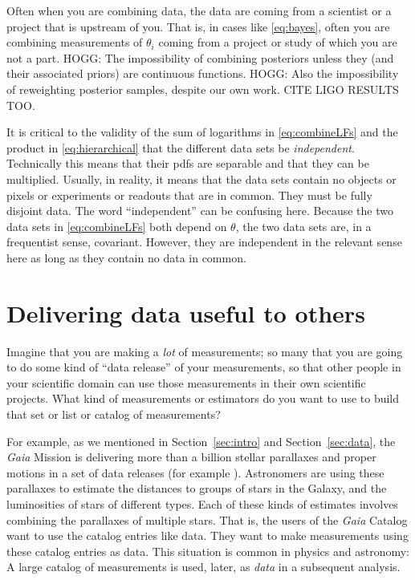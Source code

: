 \documentclass{article}
\newcommand{\sectionname}{Section}
\newcommand{\secref}[1]{\sectionname~\ref{#1}}
\begin{document}
Often when you are combining data, the data are coming from a scientist or a project that is upstream of you.
That is, in cases like \eqref{eq:bayes}, often you are combining measurements of $\theta_i$ coming from a project or study of which you are not a part.
HOGG: The impossibility of combining posteriors unless they (and their associated priors) are continuous functions.
HOGG: Also the impossibility of reweighting posterior samples, despite our own work. CITE LIGO RESULTS TOO.

It is critical to the validity of the sum of logarithms in \eqref{eq:combineLFs} and the product in \eqref{eq:hierarchical}
that the different data sets be \emph{independent}.
Technically this means that their pdfs are separable and that they can be multiplied.
Usually, in reality, it means that the data sets contain no objects or pixels or experiments or readouts that are in common.
They must be fully disjoint data.
The word ``independent'' can be confusing here.
Because the two data sets in \eqref{eq:combineLFs} both depend on $\theta$, the two data sets are, in a frequentist sense, covariant.
However, they are independent in the relevant sense here as long as they contain no data in common.

\section{Delivering data useful to others}\label{sec:catalogs}
Imagine that you are making a \emph{lot} of measurements; so many that you are going to do some kind of ``data release'' of your measurements, so that other people in your scientific domain can use those measurements in their own scientific projects.
What kind of measurements or estimators do you want to use to build that set or list or catalog of measurements?

For example, as we mentioned in \secref{sec:intro} and \secref{sec:data}, the \textsl{Gaia} Mission \cite{gaia} is delivering more than a billion stellar parallaxes and proper motions in a set of data releases (for example \cite{gaiadr3}).
Astronomers are using these parallaxes to estimate the distances to groups of stars in the Galaxy, and the luminosities of stars of different types.
Each of these kinds of estimates involves combining the parallaxes of multiple stars.
That is, the users of the \textsl{Gaia} Catalog want to use the catalog entries like data.
They want to make measurements using these catalog entries as data.
This situation is common in physics and astronomy:
A large catalog of measurements is used, later, as \emph{data} in a subsequent analysis.
\end{document}
